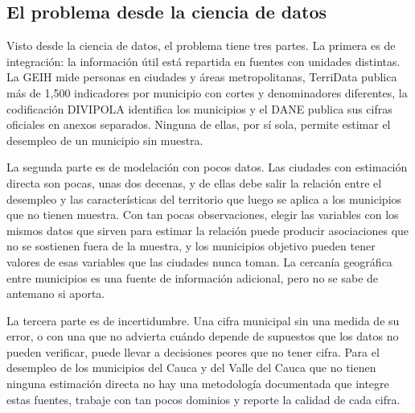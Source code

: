 \subsection{El problema desde la ciencia de datos}

Visto desde la ciencia de datos, el problema tiene tres partes. La primera es de integración: la información útil está repartida en fuentes con unidades distintas. La GEIH mide personas en ciudades y áreas metropolitanas, TerriData publica más de 1,500 indicadores por municipio con cortes y denominadores diferentes, la codificación DIVIPOLA identifica los municipios y el DANE publica sus cifras oficiales en anexos separados. Ninguna de ellas, por sí sola, permite estimar el desempleo de un municipio sin muestra.

La segunda parte es de modelación con pocos datos. Las ciudades con estimación directa son pocas, unas dos decenas, y de ellas debe salir la relación entre el desempleo y las características del territorio que luego se aplica a los municipios que no tienen muestra. Con tan pocas observaciones, elegir las variables con los mismos datos que sirven para estimar la relación puede producir asociaciones que no se sostienen fuera de la muestra, y los municipios objetivo pueden tener valores de esas variables que las ciudades nunca toman. La cercanía geográfica entre municipios es una fuente de información adicional, pero no se sabe de antemano si aporta.

La tercera parte es de incertidumbre. Una cifra municipal sin una medida de su error, o con una que no advierta cuándo depende de supuestos que los datos no pueden verificar, puede llevar a decisiones peores que no tener cifra. Para el desempleo de los municipios del Cauca y del Valle del Cauca que no tienen ninguna estimación directa no hay una metodología documentada que integre estas fuentes, trabaje con tan pocos dominios y reporte la calidad de cada cifra.
